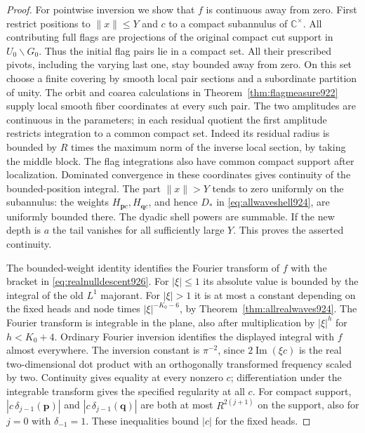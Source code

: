 \documentclass[a4paper,11pt]{article}
\theoremstyle{definition}
\theoremstyle{remark}
\numberwithin{equation}{section}
\begin{document}
\begin{proof}
For pointwise inversion we show that \(f\) is continuous away
from zero. First restrict positions to \(\|x\|\le Y\) and \(c\)
to a compact subannulus of \(\mathbb C^\times\).
All contributing full flags are projections of the original
compact cut support in \(U_0\backslash G_0\). Thus the initial
flag pairs lie in a compact set. All their prescribed pivots,
including the varying last one, stay bounded away from zero.
On this set choose a finite covering by smooth local pair
sections and a subordinate partition of unity. The orbit and
coarea calculations in Theorem~\ref{thm:flagmeasure922} supply
local smooth fiber coordinates at every such pair. The two
amplitudes are continuous in the parameters; in each residual
quotient the first amplitude restricts integration to a common
compact set. Indeed its residual radius is bounded by \(R\)
times the maximum norm of the inverse local section, by taking
the middle block. The flag integrations also have common compact
support after localization. Dominated convergence in these
coordinates gives continuity of the bounded-position integral.
The part \(\|x\|>Y\) tends to zero uniformly on the subannulus:
the weights \(H_{\mathbf p c},H_{\mathbf q c}\), and hence \(D_*\)
in \eqref{eq:allwaveshell924}, are uniformly bounded there.
The dyadic shell powers are summable. If the new depth is \(a\)
the tail vanishes for all sufficiently large \(Y\).
This proves the asserted continuity.

The bounded-weight identity identifies the Fourier transform of
\(f\) with the bracket in \eqref{eq:realnulldescent926}. For
\(|\xi|\le1\) its absolute value is bounded by the integral
of the old \(L^1\) majorant. For \(|\xi|>1\) it is at most a
constant depending on the fixed heads and node times
\(|\xi|^{-K_0-6}\), by Theorem~\ref{thm:allrealwaves924}.
The Fourier transform is integrable in the plane, also after
multiplication by \(|\xi|^h\) for \(h<K_0+4\).
Ordinary Fourier inversion identifies the displayed integral
with \(f\) almost everywhere. The inversion constant is
\(\pi^{-2}\), since \(2\operatorname{Im}(\xi c)\) is the real
two-dimensional dot product with an orthogonally transformed
frequency scaled by two. Continuity gives equality at every
nonzero \(c\); differentiation under the integrable transform
gives the specified regularity at all \(c\).
For compact support, \(|c\,\delta_{j-1}(\mathbf p)|\) and
\(|c\,\delta_{j-1}(\mathbf q)|\) are both at most
\(R^{2(j+1)}\) on the support, also for \(j=0\) with
\(\delta_{-1}=1\). These inequalities bound \(|c|\) for
the fixed heads.
\end{proof}
\clearpage
\end{document}
